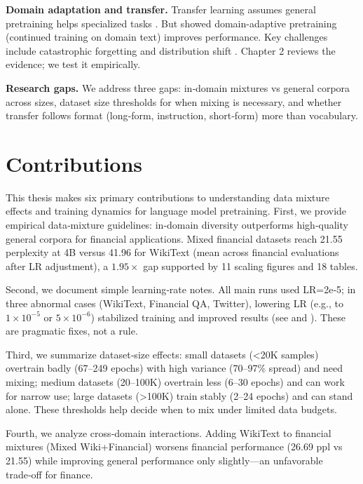 \textbf{Domain adaptation and transfer.} Transfer learning assumes general pretraining helps specialized tasks \parencite{devlin2019bert, pan2010transfer}. But \textcite{gururangan2020don} showed domain-adaptive pretraining (continued training on domain text) improves performance. Key challenges include catastrophic forgetting \parencite{kirkpatrick2017overcoming} and distribution shift \parencite{quinonero2009dataset}. Chapter 2 reviews the evidence; we test it empirically.

\textbf{Research gaps.} We address three gaps: in‑domain mixtures vs general corpora across sizes, dataset size thresholds for when mixing is necessary, and whether transfer follows format (long‑form, instruction, short‑form) more than vocabulary.

\section{Contributions}

This thesis makes six primary contributions to understanding data mixture effects and training dynamics for language model pretraining. First, we provide empirical data‑mixture guidelines: in‑domain diversity outperforms high‑quality general corpora for financial applications. Mixed financial datasets reach 21.55 perplexity at 4B versus 41.96 for WikiText (mean across financial evaluations after LR adjustment), a $1.95\times$ gap supported by 11 scaling figures and 18 tables.

Second, we document simple learning‑rate notes. All main runs used LR=2e‑5; in three abnormal cases (WikiText, Financial QA, Twitter), lowering LR (e.g., to $1\times10^{-5}$ or $5\times10^{-6}$) stabilized training and improved results (see  and ). These are pragmatic fixes, not a rule.

Third, we summarize dataset‑size effects: small datasets (<20K samples) overtrain badly (67–249 epochs) with high variance (70–97\% spread) and need mixing; medium datasets (20–100K) overtrain less (6–30 epochs) and can work for narrow use; large datasets (>100K) train stably (2–24 epochs) and can stand alone. These thresholds help decide when to mix under limited data budgets.

Fourth, we analyze cross‑domain interactions. Adding WikiText to financial mixtures (Mixed Wiki+Financial) worsens financial performance (26.69 ppl vs 21.55) while improving general performance only slightly—an unfavorable trade‑off for finance.

